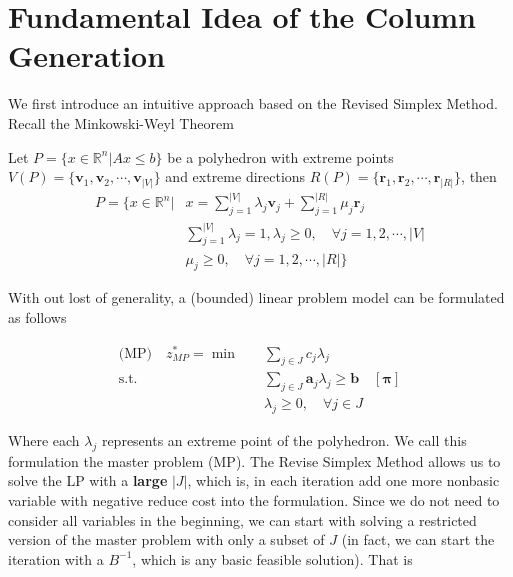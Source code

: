         \section{Fundamental Idea of the Column Generation}
            We first introduce an intuitive approach based on the Revised Simplex Method. Recall the Minkowski-Weyl Theorem

            \begin{theorem}
                Let $P = \{x \in \mathbb{R}^n | Ax \le b\}$ be a polyhedron with extreme points $V(P) = \{\mathbf{v}_1, \mathbf{v}_2, \cdots, \mathbf{v}_{|V|}\}$ and extreme directions $R(P) = \{\mathbf{r}_1, \mathbf{r}_2, \cdots, \mathbf{r}_{|R|}\}$, then
                \begin{align*}
                    P = \{x \in \mathbb{R}^n |& x = \sum_{j = 1}^{|V|} \lambda_j \mathbf{v}_j + \sum_{j = 1}^{|R|} \mu_j \mathbf{r}_j \\
                    & \sum_{j = 1}^{|V|} \lambda_j = 1, \lambda_j \ge 0, \quad \forall j = 1, 2, \cdots, |V| \\
                    & \mu_j \ge 0, \quad \forall j = 1, 2, \cdots, |R|\}
                \end{align*}
            \end{theorem}

            With out lost of generality, a (bounded) linear problem model can be formulated as follows

            \begin{align*}
                \text{(MP)} \quad  z_{MP}^* = \min \quad & \sum_{j \in J} c_j \lambda_j\\
                \text{s.t.} \quad & \sum_{j \in J} \mathbf{a}_j \lambda_j \ge \mathbf{b} \quad [\mathbf{\pi}]\\
                &\lambda_j \ge 0, \quad \forall j \in J
            \end{align*}

            Where each $\lambda_j$ represents an extreme point of the polyhedron. We call this formulation the master problem (MP). The Revise Simplex Method allows us to solve the LP with a \textbf{large} $|J|$, which is, in each iteration add one more nonbasic variable with negative reduce cost into the formulation. Since we do not need to consider all variables in the beginning, we can start with solving a restricted version of the master problem with only a subset of $J$ (in fact, we can start the iteration with a $B^{-1}$, which is any basic feasible solution). That is

